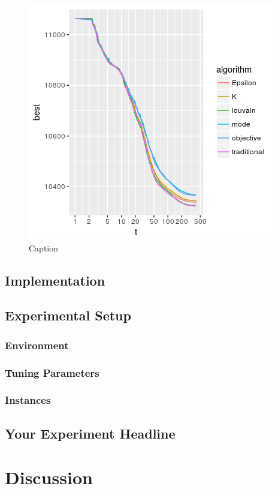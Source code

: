 \documentclass[a4paper,12pt,bibtotoc,titlepage, liststotoc,BCOR7mm,headsepline,pointlessnumbers]{scrbook}
\numberwithin{equation}{section}
\begin{document}
\begin{figure}[t!] 
    \vspace*{-.25cm}
  \centering

   \includegraphics[width=.8\textwidth]{img/cross combines.png}
  \caption{Caption}
    \vspace*{-.5cm}
\end{figure}
\section{Implementation}
\section{Experimental Setup}
\subsection{Environment}
\subsection{Tuning Parameters}
\subsection{Instances}
\section{Your Experiment Headline}
\chapter{Discussion}
\end{document}
